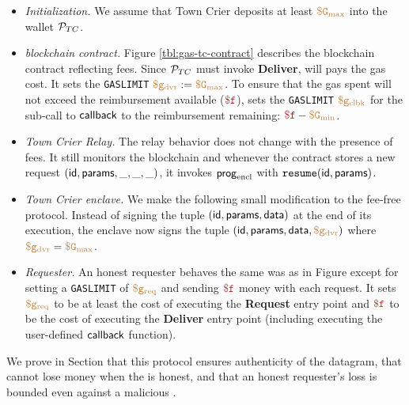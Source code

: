\begin{itemize}[leftmargin=1.5em]
  \item {\it Initialization.}
    We assume that Town Crier deposits at least $\tt {\color{brown} \$G_\text{max} }$ into the wallet ${\cal P}_{TC}$.

  \item {\it \tcs blockchain contract.}
    Figure \ref{tbl:gas-tc-contract} describes the \tcs blockchain contract reflecting fees.
    Since ${\cal P}_{TC}$ must invoke {\bf Deliver}, \tc will pays the gas cost.
    It sets the {\tt GASLIMIT} $\tt {\color{brown} \$g_\text{dvr} } := \tt {\color{brown} \$G_\text{max} }$.
    To ensure that the gas spent will not exceed the reimbursement available ($\fee$),
    \tcont sets the {\tt GASLIMIT} $\tt {\color{brown} \$g_\text{clbk} }$ for the sub-call to ${\sf callback}$ to the reimbursement remaining: $\fee - \constgasmin$.

  \item {\it Town Crier Relay.}
    The relay behavior does not change with the presence of fees.
    It still monitors the blockchain and whenever the contract \tcont stores a new request $({\sf id}, {\sf params}, \_, \_, \_)$,
    it invokes ${\sf prog}_{\textrm{encl}}$ with $\texttt{resume}({\sf id}, {\sf params})$.

  \item {\it Town Crier enclave.}
    We make the following small modification to the fee-free protocol.
    Instead of signing the tuple $({\sf id}, {\sf params}, {\sf data})$ at the end of its execution,
    the enclave now signs the tuple $({\sf id}, {\sf params}, {\sf data}, \tt {\color{brown} \$g_\text{dvr} })$ where $\tt {\color{brown} \$g_\text{dvr} } = \tt {\color{brown} \$G_\text{max} }$.

  \item {\it Requester.}
    An honest requester behaves the same was as in Figure  except for setting a {\tt GASLIMIT} of $\tt {\color{brown} \$g_\text{req} }$ and sending $\fee$ money with each request.
    It sets $\tt {\color{brown} \$g_\text{req} }$ to be at least the cost of executing the {\bf Request} entry point
    and $\fee$ to be the cost of executing the {\bf Deliver} entry point (including executing the user-defined ${\sf callback}$ function).
\end{itemize}

We prove in Section  that this protocol ensures authenticity of the datagram, that \tc cannot lose money when the \medname is honest,
and that an honest requester's loss is bounded even against a malicious \tc.


